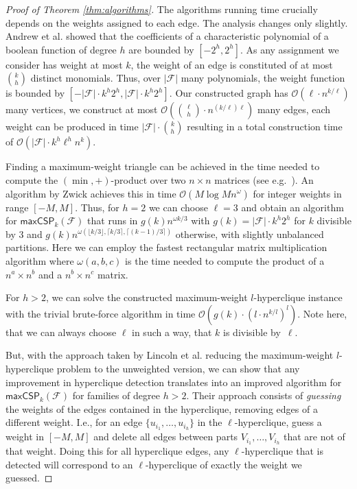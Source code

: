 \documentclass[a4paper,UKenglish,cleveref, autoref, thm-restate,numberwithinsect]{lipics-v2021}
\newcommand{\bigO}{\mathcal{O}}
\newcommand{\maxcspk}{\textsf{maxCSP}_{k}}
\newcommand{\Fam}{\mathcal{F}}
\begin{document}
\begin{proof}[Proof of Theorem \ref{thm:algorithms}]
The algorithms running time crucially depends on the weights assigned to each edge.
The analysis changes only slightly. Andrew et al. showed that the coefficients of a characteristic polynomial of a boolean function of degree $h$ are bounded by $[-2^h,2^h]$.
As any assignment we consider has weight at most $k$, the weight of an edge is constituted of at most $k \choose h$ distinct monomials. 
Thus, over $|\Fam|$ many polynomials, the weight function is bounded by $[ -|\Fam|\cdot k^h 2^h,|\Fam|\cdot k^h 2^h ]$.
Our constructed graph has $\mathcal{O}(\ell \cdot n^{k/\ell})$ many vertices, 
we construct at most $\mathcal{O}\left({\ell \choose h} \cdot n^{ (k/\ell) \ell}\right)$ many edges, 
each weight can be produced in time $|\Fam| \cdot {k \choose h}$ resulting in a total construction time of $\mathcal{O}\left(|\Fam| \cdot k^h \ell^h n^k\right)$.

Finding a maximum-weight triangle can be achieved in the time needed to compute the $(\min,+)$-product over two $n\times n$ matrices (see e.g.~\cite{VassilevskaW06}). An algorithm by Zwick \cite{Zwick02} achieves this in time $\mathcal{O}(M \log M n^\omega)$ for integer weights in range $[-M,M]$.
Thus, for $h = 2$ we can choose $\ell = 3$ and obtain an algorithm for $\maxcspk(\Fam)$ that runs in $g(k) n^{\omega k/3}$ with $g(k) = |\Fam|\cdot k^h 2^h$ for $k$ divisible by $3$ and $g(k) n^{\omega (\lfloor k/3\rfloor,\lceil k/3\rceil,\lceil (k-1)/3\rceil)}$ otherwise, with slightly unbalanced partitions. Here we can employ the fastest rectangular matrix multiplication algorithm where $\omega(a,b,c)$ is the time needed to compute the product of a $n^a\times n^b$ and a $n^b \times n^c$ matrix.

For $h>2$, we can solve the constructed maximum-weight $l$-hyperclique instance with the trivial brute-force algorithm in 
time $\bigO\left(g(k) \cdot (l\cdot n^{k/l})^l\right)$. Note here, that we can always choose $\ell$ in such a way, that $k$ is divisible by~$\ell$. 

But, with the approach taken by Lincoln et al. reducing the maximum-weight $l$-hyperclique problem to the unweighted version,
we can show that any improvement in hyperclique detection translates into an improved algorithm for $\maxcspk(\Fam)$ for families of degree $h > 2$.
Their approach consists of \emph{guessing} the weights of the edges contained in the hyperclique, removing edges of a different weight. I.e., for an edge $\{u_{i_1},\dots,u_{i_h}\}$ in the $\ell$-hyperclique, guess a weight in $[-M,M]$ and delete all edges between parts $V_{i_1},\dots,V_{i_h}$ that are not of that weight. Doing this for all hyperclique edges, any $\ell$-hyperclique that is detected will correspond to an $\ell$-hyperclique of exactly the weight we guessed.


\end{proof}
\end{document}
